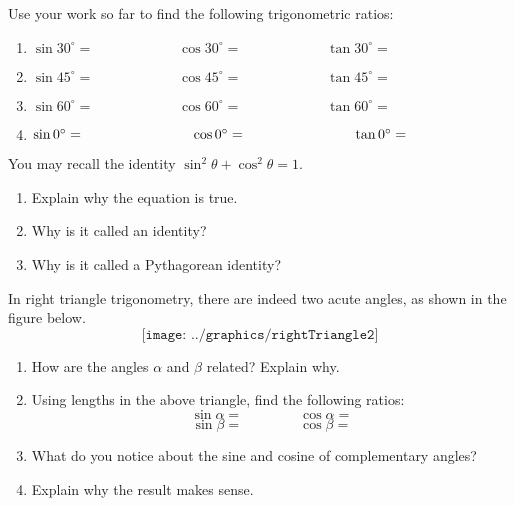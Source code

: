 \begin{prob}
Use your work so far to find the following trigonometric ratios:
\begin{enumerate}
\item $\sin 30^\circ = \hspace{1in} \cos30^\circ = \hspace{1in} \tan30^\circ =$
\item $\sin 45^\circ = \hspace{1in} \cos45^\circ = \hspace{1in} \tan45^\circ =$
\item $\sin 60^\circ = \hspace{1in} \cos60^\circ = \hspace{1in} \tan60^\circ =$
\item $\sin 0^\circ = \hspace{1.08in} \cos0^\circ = \hspace{1.08in} \tan0^\circ =$
\end{enumerate}
\end{prob}

\begin{prob}
You may recall the identity $\sin^2\theta+\cos^2\theta=1$.  
\begin{enumerate}
\item Explain why the equation is true.  
\item Why is it called an identity? 
\item Why is it called a Pythagorean identity?  
\end{enumerate}
\end{prob}

\begin{prob}
In right triangle trigonometry, there are indeed two acute angles, as shown in the figure below.
$$\texttt{[image: ../graphics/rightTriangle2]}$$
\begin{enumerate}
\item How are the angles $\alpha$ and $\beta$ related?  Explain why.
\item Using lengths in the above triangle, find the following ratios:    
$$\sin\alpha = \qquad\qquad \cos\alpha = $$
$$\sin\beta = \qquad\qquad \cos\beta = $$
\item What do you notice about the sine and cosine of complementary angles?  
\item Explain why the result makes sense.  
\end{enumerate}
\end{prob}

